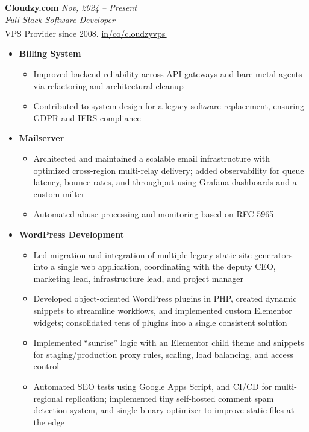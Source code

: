 \documentclass[9pt,a4paper]{article}
\let\orighref\href
\renewcommand{\href}[2]{\orighref{#1}{#2\,{\textsuperscript{\tiny{\textcolor{heritagered}{\faExternalLink}}}}}}
\newlength{\ListLeftMargin}   \setlength{\ListLeftMargin}{0.15in}
\newlength{\ProjectTopSep}   \setlength{\ProjectTopSep}{1pt}
\newlength{\ProjectItemSep}  \setlength{\ProjectItemSep}{1pt}
\newcommand{\deemph}[1]{{\color{gray}#1}}
\newcommand{\ProjHeading}[1]{%
  \item \textbf{#1}%
}
\newenvironment{ProjectBlock}{%
  \begin{itemize}[leftmargin=\ListLeftMargin, topsep=\ProjectTopSep, itemsep=\ProjectItemSep, parsep=0pt, label={}]
}{%
  \end{itemize}
}
\newcommand{\PositionHeader}[4]{%
  \vspace{2pt}%
  \noindent\textbf{#1} \hfill \textit{\small\deemph{\textcolor{marineblue}{#4}}} \\%
  \noindent\textit{\small #3} \\%
  \noindent\small\deemph{#2}%
  \vspace{4pt}%
}
\begin{document}
\PositionHeader{Cloudzy.com}{VPS Provider since 2008. \href{https://www.linkedin.com/company/cloudzyvps/}{in/co/cloudzyvps}}{Full-Stack Software Developer}{Nov, 2024 -- Present}
\begin{ProjectBlock}
  \ProjHeading{Billing System}
    \begin{itemize}[leftmargin=*, topsep=\ProjectTopSep, itemsep=\ProjectItemSep, parsep=0pt, label=\textbullet]
      \item Improved backend reliability across API gateways and bare-metal agents via refactoring and architectural cleanup
      \item Contributed to system design for a legacy software replacement, ensuring GDPR and IFRS compliance
    \end{itemize}

  \ProjHeading{Mailserver}
    \begin{itemize}[leftmargin=*, topsep=\ProjectTopSep, itemsep=\ProjectItemSep, parsep=0pt, label=\textbullet]
      \item Architected and maintained a scalable email infrastructure with optimized cross-region multi-relay delivery; added observability for queue latency, bounce rates, and throughput using Grafana dashboards and a custom milter
      \item Automated abuse processing and monitoring based on RFC 5965
    \end{itemize}

  \ProjHeading{WordPress Development}
    \begin{itemize}[leftmargin=*, topsep=\ProjectTopSep, itemsep=\ProjectItemSep, parsep=0pt, label=\textbullet]
      \item Led migration and integration of multiple legacy static site generators into a single web application, coordinating with the deputy CEO, marketing lead, infrastructure lead, and project manager
      \item Developed object-oriented WordPress plugins in PHP, created dynamic snippets to streamline workflows, and implemented custom Elementor widgets; consolidated tens of plugins into a single consistent solution
      \item Implemented ``sunrise'' logic with an Elementor child theme and snippets for staging/production proxy rules, scaling, load balancing, and access control
      \item Automated SEO tests using Google Apps Script, and CI/CD for multi-regional replication; implemented tiny self-hosted comment spam detection system, and single-binary optimizer to improve static files at the edge
    \end{itemize}


\end{ProjectBlock}
\end{document}
